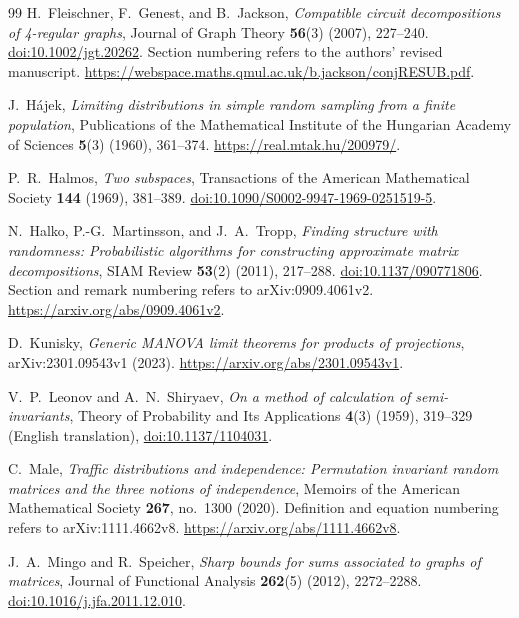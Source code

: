\documentclass[11pt]{article}
\theoremstyle{definition}
\theoremstyle{remark}
\theoremstyle{plain}
\begin{document}
\begin{thebibliography}{99}
H.~Fleischner, F.~Genest, and B.~Jackson,
\emph{Compatible circuit decompositions of 4-regular graphs},
Journal of Graph Theory \textbf{56}(3) (2007), 227--240.
\href{https://doi.org/10.1002/jgt.20262}{doi:10.1002/jgt.20262}.
Section numbering refers to the authors' revised manuscript.
\url{https://webspace.maths.qmul.ac.uk/b.jackson/conjRESUB.pdf}.

J.~H\'ajek,
\emph{Limiting distributions in simple random sampling from a
finite population},
Publications of the Mathematical Institute of the Hungarian
Academy of Sciences \textbf{5}(3) (1960), 361--374.
\url{https://real.mtak.hu/200979/}.

P.~R.~Halmos,
\emph{Two subspaces},
Transactions of the American Mathematical Society \textbf{144}
(1969), 381--389.
\href{https://doi.org/10.1090/S0002-9947-1969-0251519-5}{doi:10.1090/S0002-9947-1969-0251519-5}.

N.~Halko, P.-G.~Martinsson, and J.~A.~Tropp,
\emph{Finding structure with randomness: Probabilistic algorithms
for constructing approximate matrix decompositions},
SIAM Review \textbf{53}(2) (2011), 217--288.
\href{https://doi.org/10.1137/090771806}{doi:10.1137/090771806}.
Section and remark numbering refers to arXiv:0909.4061v2.
\url{https://arxiv.org/abs/0909.4061v2}.

D.~Kunisky,
\emph{Generic MANOVA limit theorems for products of projections},
arXiv:2301.09543v1 (2023).
\url{https://arxiv.org/abs/2301.09543v1}.

V.~P.~Leonov and A.~N.~Shiryaev,
\emph{On a method of calculation of semi-invariants},
Theory of Probability and Its Applications
\textbf{4}(3) (1959), 319--329 (English translation),
\href{https://doi.org/10.1137/1104031}{doi:10.1137/1104031}.

C.~Male,
\emph{Traffic distributions and independence: Permutation invariant
random matrices and the three notions of independence},
Memoirs of the American Mathematical Society \textbf{267},
no.~1300 (2020).
Definition and equation numbering refers to arXiv:1111.4662v8.
\url{https://arxiv.org/abs/1111.4662v8}.

J.~A.~Mingo and R.~Speicher,
\emph{Sharp bounds for sums associated to graphs of matrices},
Journal of Functional Analysis \textbf{262}(5) (2012), 2272--2288.
\href{https://doi.org/10.1016/j.jfa.2011.12.010}{doi:10.1016/j.jfa.2011.12.010}.


\end{thebibliography}
\end{document}
